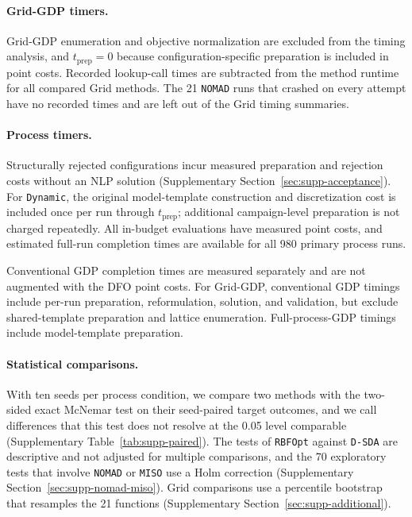 \documentclass{article}
\begin{document}
\paragraph{Grid-GDP timers.}
Grid-GDP enumeration and objective normalization are excluded from the timing analysis, and \(t_{\mathrm{prep}}=0\) because configuration-specific preparation is included in point costs.
Recorded lookup-call times are subtracted from the method runtime for all compared Grid methods.
The 21 \texttt{NOMAD} runs that crashed on every attempt have no recorded times and are left out of the Grid timing summaries.

\paragraph{Process timers.}
Structurally rejected configurations incur measured preparation and rejection costs without an NLP solution (Supplementary Section~\ref{sec:supp-acceptance}).
For \texttt{Dynamic}, the original model-template construction and discretization cost is included once per run through \(t_{\mathrm{prep}}\); additional campaign-level preparation is not charged repeatedly.
All in-budget evaluations have measured point costs, and estimated full-run completion times are available for all 980 primary process runs.

Conventional GDP completion times are measured separately and are not augmented with the DFO point costs.
For Grid-GDP, conventional GDP timings include per-run preparation, reformulation, solution, and validation, but exclude shared-template preparation and lattice enumeration.
Full-process-GDP timings include model-template preparation.

\paragraph{Statistical comparisons.}
With ten seeds per process condition, we compare two methods with the two-sided exact McNemar test on their seed-paired target outcomes, and we call differences that this test does not resolve at the 0.05 level comparable (Supplementary Table~\ref{tab:supp-paired}).
The tests of \texttt{RBFOpt} against \texttt{D-SDA} are descriptive and not adjusted for multiple comparisons, and the 70 exploratory tests that involve \texttt{NOMAD} or \texttt{MISO} use a Holm correction (Supplementary Section~\ref{sec:supp-nomad-miso}).
Grid comparisons use a percentile bootstrap that resamples the 21 functions (Supplementary Section~\ref{sec:supp-additional}).
\end{document}
